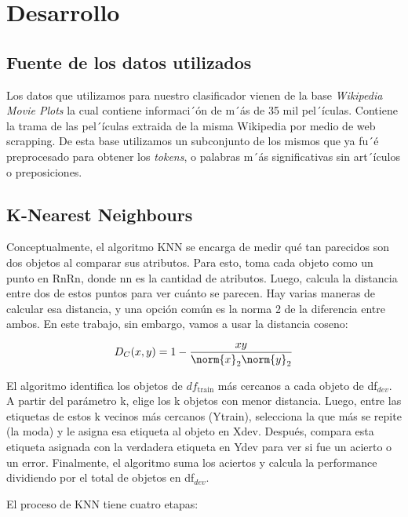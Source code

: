 \section{Desarrollo}
\label{sec:desarrollo}

\subsection{Fuente de los datos utilizados}

Los datos que utilizamos para nuestro clasificador vienen de la base \textit{Wikipedia
Movie Plots} \cite{wiki-movie-plot} la cual contiene informaci´ón de m´ás de 35 mil pel´ículas. Contiene la trama de las pel´ículas extraida de la misma Wikipedia por medio de web scrapping. De esta base utilizamos un subconjunto de los mismos \cite{wiki-movie-plot-tokens} que ya fu´é preprocesado para obtener los \textit{tokens}, o palabras m´ás significativas sin art´ículos o preposiciones. 

\subsection{K-Nearest Neighbours}
\label{sec:knn}
Conceptualmente, el algoritmo KNN se encarga de medir qué tan parecidos son dos objetos al comparar sus atributos. Para esto, toma cada objeto como un punto en RnRn, donde nn es la cantidad de atributos. Luego, calcula la distancia entre dos de estos puntos para ver cuánto se parecen. Hay varias maneras de calcular esa distancia, y una opción común es la norma 2 de la diferencia entre ambos. En este trabajo, sin embargo, vamos a usar la distancia coseno:

\[
D_{C}(x, y) = 1- \frac{xy}{ \norm{x}_{2} \norm{y}_{2} }
\]

El algoritmo identifica los objetos de $df_{\text{train}}$ más cercanos a cada objeto de df$_{dev}$. A partir del parámetro k, elige los k objetos con menor distancia. Luego, entre las etiquetas de estos k vecinos más cercanos (Ytrain), selecciona la que más se repite (la moda) y le asigna esa etiqueta al objeto en Xdev. Después, compara esta etiqueta asignada con la verdadera etiqueta en Ydev para ver si fue un acierto o un error. Finalmente, el algoritmo suma los aciertos y calcula la performance dividiendo por el total de objetos en df$_{dev}$.

El proceso de KNN tiene cuatro etapas:

